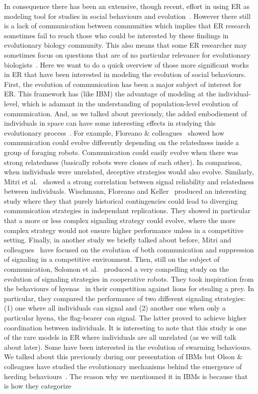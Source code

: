     In consequence there has been an extensive, though recent, effort in using ER as modeling tool for studies in social behaviours and evolution~\cite{Mitri2012, Trianni2014b, Eiben2014, Doncieux2015a}. However there still is a lack of communication between communities which implies that ER research sometimes fail to reach those who could be interested by these findings in evolutionary biology community. This also means that some ER researcher may sometimes focus on questions that are of no particular relevance for evolutionary biologists~\cite{Trianni2014b, Doncieux2015a}. Here we want to do a quick overview of those more significant works in ER that have been interested in modeling the evolution of social behaviours. First, the evolution of communication has been a major subject of interest for ER. This framework has (like IBM) the advantage of modeling at the individual-level, which is adamant in the understanding of population-level evolution of communication. And, as we talked about previously, the added embodiement of individuals in space can have some interesting effects in studying this evolutionary process~\cite{Mitri2009}. For example, Floreano & colleagues~\cite{Floreano2007} showed how communication could evolve differently depending on the relatedness inside a group of foraging robots. Communication could easily evolve when there was strong relatedness (basically robots were clones of each other). In comparison, when individuals were unrelated, deceptive strategies would also evolve. Similarly, Mitri et al.~\cite{Mitri2011} showed a strong correlation between signal reliability and relatedness between individuals. Wischmann, Floreano and Keller~\cite{Wischmann2012} produced an interesting study where they that purely historical contingencies could lead to diverging communication strategies in independant replications. They showed in particular that a more or less complex signaling strategy could evolve, where the more complex strategy would not ensure higher performance unless in a competitive setting. Finally, in another study we briefly talked about before, Mitri and colleagues~\cite{Mitri2009} have focused on the evolution of both communication and suppression of signaling in a competitive environment. Then, still on the subject of communication, Solomon et al.~\cite{Solomon2012} produced a very compelling study on the evolution of signaling strategies in cooperative robots. They took inspiration from the behaviours of hyenas~\cite{Smith2010} in their competition against lions for stealing a prey. In particular, they compared the performance of two different signaling strategies: (1) one where all individuals can signal and (2) another one when only a particular hyena, the flag-bearer can signal. The latter proved to achieve higher coordination between individuals. It is interesting to note that this study is one of the rare models in ER where individuals are all unrelated (as we will talk about later). Some have been interested in the evolution of swarming behaviours. We talked about this previously during our presentation of IBMs but Olson & colleagues have studied the evolutionary mechanisms behind the emergence of herding behaviours~\cite{Olson2013, Olson2013a, Haley2014}. The reason why we mentionned it in IBMs is because that is how they categorize 